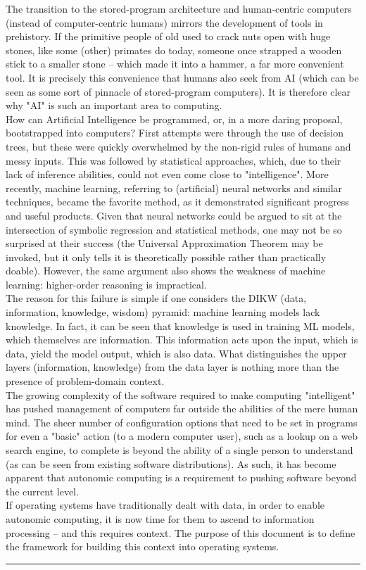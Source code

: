 The transition to the stored-program architecture and human-centric computers (instead of computer-centric humans) mirrors the development of tools in prehistory. If the primitive people of old used to crack nuts open with huge stones, like some (other) primates do today, someone once strapped a wooden stick to a smaller stone -- which made it into a hammer, a far more convenient tool. It is precisely this convenience that humans also seek from AI (which can be seen as some sort of pinnacle of stored-program computers). It is therefore clear why "AI" is such an important area to computing.\\

How can Artificial Intelligence be programmed, or, in a more daring proposal, bootstrapped into computers? First attempts were through the use of decision trees, but these were quickly overwhelmed by the non-rigid rules of humans and messy inputs. This was followed by statistical approaches, which, due to their lack of inference abilities, could not even come close to "intelligence". More recently, machine learning, referring to (artificial) neural networks and similar techniques, became the favorite method, as it demonstrated significant progress and useful products. Given that neural networks could be argued to sit at the intersection of symbolic regression and statistical methods, one may not be so surprised at their success (the Universal Approximation Theorem may be invoked, but it only tells it is theoretically possible rather than practically doable). However, the same argument also shows the weakness of machine learning: higher-order reasoning is impractical.\\

The reason for this failure is simple if one considers the DIKW (data, information, knowledge, wisdom) pyramid: machine learning models lack knowledge. In fact, it can be seen that knowledge is used in training ML models, which themselves are information. This information acts upon the input, which is data, yield the model output, which is also data. What distinguishes the upper layers (information, knowledge) from the data layer is nothing more than the presence of problem-domain context.\\

The growing complexity of the software required to make computing "intelligent" has pushed management of computers far outside the abilities of the mere human mind. The sheer number of configuration options that need to be set in programs for even a "basic" action (to a modern computer user), such as a lookup on a web search engine, to complete is beyond the ability of a single person to understand (as can be seen from existing software distributions). As such, it has become apparent that autonomic computing is a requirement to pushing software beyond the current level.\\

If operating systems have traditionally dealt with data, in order to enable autonomic computing, it is now time for them to ascend to information processing -- and this requires context. The purpose of this document is to define the framework for building this context into operating systems.
\hrule
